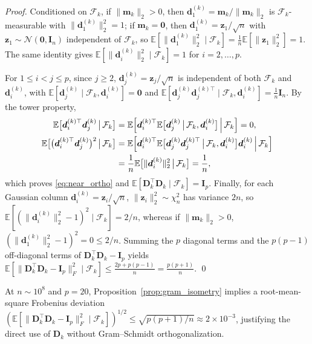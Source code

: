 \documentclass[smallextended]{svjour3}
\newcommand{\bd}{\bm{d}}
\newcommand{\bz}{\bm{z}}
\begin{document}
\begin{proof}
Conditioned on $\mathcal{F}_k$, if $\|\bm m_k\|_2 > 0$, then $\bd_1^{(k)} = \bm m_k / \|\bm m_k\|_2$ is $\mathcal{F}_k$-measurable with $\|\bd_1^{(k)}\|_2^2 = 1$; if $\bm m_k = \bm 0$, then $\bd_1^{(k)} = \bz_1/\sqrt{n}$ with $\bz_1 \sim \mathcal{N}(\bm 0, \bm I_n)$ independent of $\mathcal{F}_k$, so $\mathbb{E}[\|\bd_1^{(k)}\|_2^2 \mid \mathcal{F}_k] = \frac{1}{n}\mathbb{E}[\|\bz_1\|_2^2] = 1$. The same identity gives $\mathbb{E}[\|\bd_i^{(k)}\|_2^2 \mid \mathcal{F}_k] = 1$ for $i = 2, \ldots, p$.

For $1 \le i < j \le p$, since $j \ge 2$, $\bd_j^{(k)} = \bz_j/\sqrt{n}$ is independent of both $\mathcal{F}_k$ and $\bd_i^{(k)}$, with $\mathbb{E}[\bd_j^{(k)} \mid \mathcal{F}_k, \bd_i^{(k)}] = \bm 0$ and $\mathbb{E}[\bd_j^{(k)}\bd_j^{(k)\top} \mid \mathcal{F}_k, \bd_i^{(k)}] = \frac{1}{n}\bm I_n$. By the tower property,
\begin{align*}
\mathbb{E}\bigl[\bd_i^{(k)\top}\bd_j^{(k)} \,\big|\, \mathcal{F}_k\bigr]
&= \mathbb{E}\Bigl[\bd_i^{(k)\top}\mathbb{E}\bigl[\bd_j^{(k)} \,\big|\, \mathcal{F}_k, \bd_i^{(k)}\bigr] \,\Big|\, \mathcal{F}_k\Bigr] = 0, \\
\mathbb{E}\bigl[\bigl(\bd_i^{(k)\top}\bd_j^{(k)}\bigr)^2 \,\big|\, \mathcal{F}_k\bigr]
&= \mathbb{E}\Bigl[\bd_i^{(k)\top}\mathbb{E}\bigl[\bd_j^{(k)}\bd_j^{(k)\top} \,\big|\, \mathcal{F}_k, \bd_i^{(k)}\bigr]\bd_i^{(k)} \,\Big|\, \mathcal{F}_k\Bigr] \\
&= \frac{1}{n}\mathbb{E}\bigl[\|\bd_i^{(k)}\|_2^2 \,\big|\, \mathcal{F}_k\bigr] = \frac{1}{n},
\end{align*}
which proves \eqref{eq:near_ortho} and $\mathbb{E}[\bm D_k^\top \bm D_k \mid \mathcal{F}_k] = \bm I_p$. Finally, for each Gaussian column $\bd_i^{(k)} = \bz_i/\sqrt{n}$, $\|\bz_i\|_2^2 \sim \chi^2_n$ has variance $2n$, so $\mathbb{E}[(\|\bd_i^{(k)}\|_2^2 - 1)^2 \mid \mathcal{F}_k] = 2/n$, whereas if $\|\bm m_k\|_2 > 0$, $(\|\bd_1^{(k)}\|_2^2 - 1)^2 = 0 \le 2/n$. Summing the $p$ diagonal terms and the $p(p-1)$ off-diagonal terms of $\bm D_k^\top \bm D_k - \bm I_p$ yields $\mathbb{E}[\|\bm D_k^\top \bm D_k - \bm I_p\|_F^2 \mid \mathcal{F}_k] \le \frac{2p + p(p-1)}{n} = \frac{p(p+1)}{n}$.
\qed
\end{proof}

At $n \sim 10^8$ and $p = 20$, Proposition~\ref{prop:gram_isometry} implies a root-mean-square Frobenius deviation $(\mathbb{E}[\|\bm D_k^\top \bm D_k - \bm I_p\|_F^2 \mid \mathcal{F}_k])^{1/2} \le \sqrt{p(p+1)/n} \approx 2 \times 10^{-3}$, justifying the direct use of $\bm D_k$ without Gram--Schmidt orthogonalization.
\end{document}
